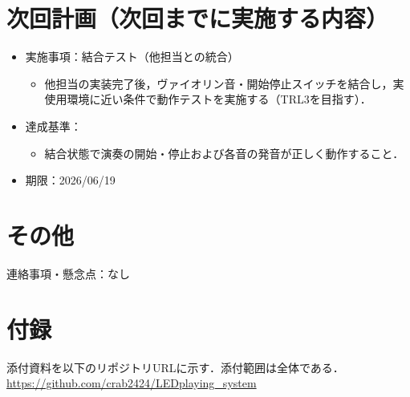 \documentclass[lualatex,paper=a4paper,jafontsize=11.5pt,jafontscale=1.05]{jlreq}
\begin{document}
\section{次回計画（次回までに実施する内容）}
\begin{itemize}
  \item 実施事項：結合テスト（他担当との統合）
  \begin{itemize}
    \item 他担当の実装完了後，ヴァイオリン音・開始停止スイッチを結合し，実使用環境に近い条件で動作テストを実施する（TRL3を目指す）．
  \end{itemize}
  \item 達成基準：
  \begin{itemize}
    \item 結合状態で演奏の開始・停止および各音の発音が正しく動作すること．
  \end{itemize}
  \item 期限：2026/06/19
\end{itemize}

\section{その他}
連絡事項・懸念点：なし

\section{付録}
添付資料を以下のリポジトリURLに示す．添付範囲は全体である．\\
\url{https://github.com/crab2424/LEDplaying_system}
\end{document}
